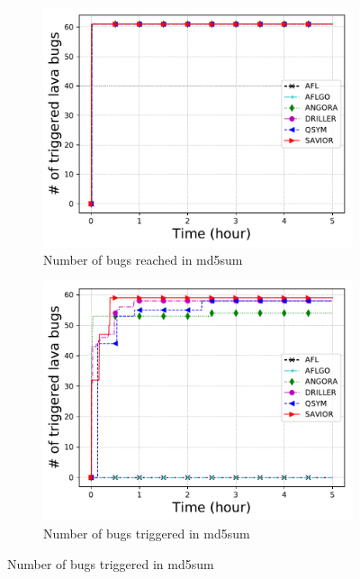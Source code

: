 \begin{figure}[htb]
\begin{subfigure}[b]{0.24\textwidth}
    \end{subfigure}\\
    \begin{subfigure}[b]{0.24\textwidth}
        \centering
        \includegraphics[width=1\textwidth]{savior/figures/lava_md5sum_bugcov.pdf}
        \caption{\scriptsize{Number of bugs reached in md5sum}}
        \label{fig:eval:lava:who}
    \end{subfigure}  
    \begin{subfigure}[b]{0.24\textwidth}
        \centering
        \includegraphics[width=1\textwidth]{savior/figures/lava_md5sum.pdf}
        \caption{\scriptsize{Number of bugs triggered in md5sum}}

\end{subfigure}
\end{figure}
